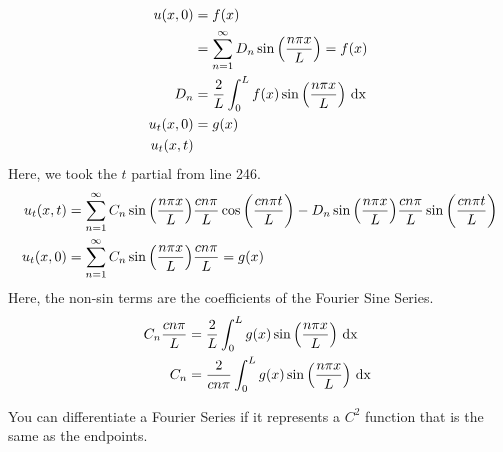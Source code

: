\begin{enumerate}
\begin{align}
    u(x, 0) & = f(x)\\
    & = \sum^\infty_{n = 1} D_n \sin \Big( \frac{n \pi x}{L} \Big) = f(x)\\
    D_n & = \frac{2}{L} \int^L_0 f(x) \sin \Big( \frac{n \pi x}{L} \Big) \text{ dx }\\
    u_t(x, 0) & = g(x)\\
    u_t(x, t)
  \end{align}
  Here, we took the $t$ partial from line 246.
  \begin{align}
    u_t(x, t) & = \sum^\infty_{n = 1} C_n \sin \Big( \frac{n \pi x}{L} \Big) \frac{c n \pi}{L} \cos \left(\frac{c n \pi t}{L}\right) - D_n \sin \Big( \frac{n \pi x}{L} \Big) \frac{c n \pi}{L} \sin\left( \frac{c n \pi t}{L} \right)\\
    u_t(x, 0) & = \sum^\infty_{n = 1} C_n \sin \Big( \frac{n \pi x}{L} \Big) \frac{c n \pi}{L} = g(x)
  \end{align}
  Here, the non-sin terms are the coefficients of the Fourier Sine Series.
  \begin{align}
    C_n \frac{c n \pi}{L} & = \frac{2}{L} \int^L_0 g(x) \sin \Big( \frac{n \pi x}{L} \Big) \text{ dx }\\
    C_n & = \frac{2}{c n \pi} \int^L_0 g(x) \sin \Big( \frac{n \pi x}{L} \Big) \text{ dx }
  \end{align}
\end{enumerate}
\thm You can differentiate a Fourier Series if it represents a $C^2$ function that is the same as the endpoints.

